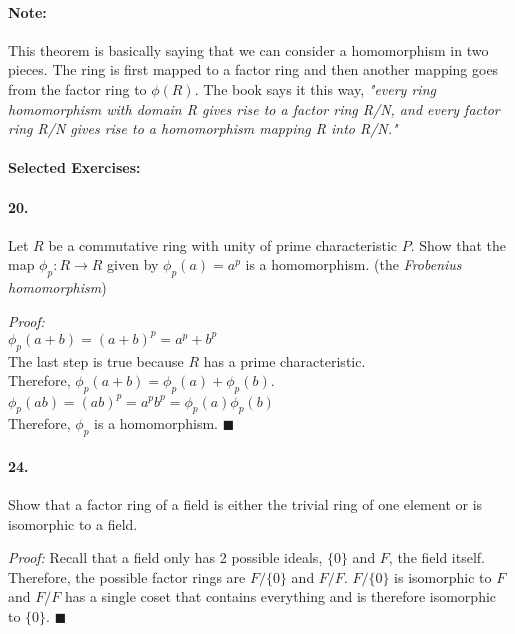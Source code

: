\documentclass[10pt,a4paper]{article}
\begin{document}
\paragraph{Note:} This theorem is basically saying that we can consider a homomorphism in two pieces. The ring is first mapped to a factor ring and then another mapping goes from the factor ring to $\phi(R)$. The book says it this way, \textit{"every ring homomorphism with domain R gives rise to a factor ring R/N, and every factor ring R/N gives rise to a homomorphism mapping R into R/N."}

\paragraph{Selected Exercises:}

\paragraph{20.} Let $R$ be a commutative ring with unity of prime characteristic $P$. Show that the map $\phi_p: R \to R$ given by $\phi_p(a) = a^p$ is a homomorphism. (the \textit{Frobenius homomorphism})

\begin{flushleft}
\textit{Proof:}\\
$\phi_p(a+b) = (a+b)^p = a^p +b^p$\\
The last step is true because $R$ has a prime characteristic.\\
Therefore, $\phi_p(a+b) = \phi_p(a)+\phi_p(b)$.\\
$\phi_p(ab) = (ab)^p = a^pb^p = \phi_p(a)\phi_p(b)$\\
Therefore, $\phi_p$ is a homomorphism. $\blacksquare$
\end{flushleft}

\paragraph{24.} Show that a factor ring of a field is either the trivial ring of one element or is isomorphic to a field.

\begin{flushleft}
\textit{Proof:} Recall that a field only has 2 possible ideals, $\{0\}$ and $F$, the field itself. Therefore, the possible factor rings are $F/\{0\}$ and $F/F$. $F/\{0\}$ is isomorphic to $F$ and $F/F$ has a single coset that contains everything and is therefore isomorphic to $\{0\}$. $\blacksquare$
\end{flushleft}
\end{document}
